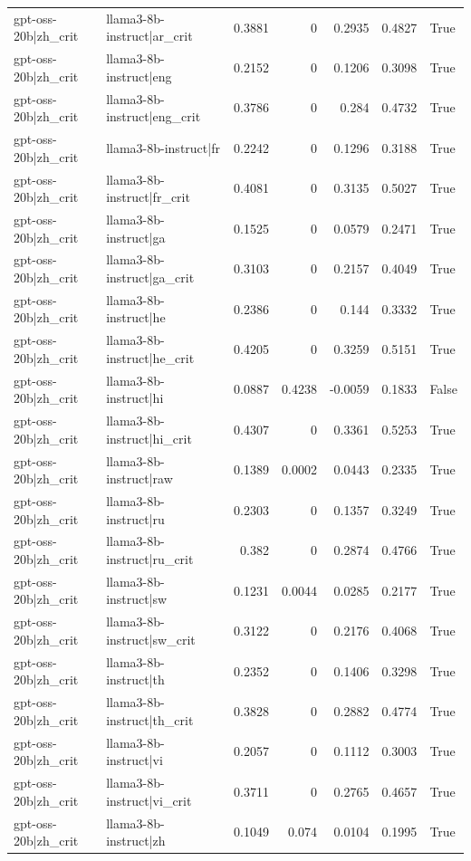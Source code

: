 \begin{table}
\begin{tabular}{l l r r r r l}
gpt-oss-20b|zh_crit & llama3-8b-instruct|ar_crit & 0.3881 & 0 & 0.2935 & 0.4827 & True \\
gpt-oss-20b|zh_crit & llama3-8b-instruct|eng & 0.2152 & 0 & 0.1206 & 0.3098 & True \\
gpt-oss-20b|zh_crit & llama3-8b-instruct|eng_crit & 0.3786 & 0 & 0.284 & 0.4732 & True \\
gpt-oss-20b|zh_crit & llama3-8b-instruct|fr & 0.2242 & 0 & 0.1296 & 0.3188 & True \\
gpt-oss-20b|zh_crit & llama3-8b-instruct|fr_crit & 0.4081 & 0 & 0.3135 & 0.5027 & True \\
gpt-oss-20b|zh_crit & llama3-8b-instruct|ga & 0.1525 & 0 & 0.0579 & 0.2471 & True \\
gpt-oss-20b|zh_crit & llama3-8b-instruct|ga_crit & 0.3103 & 0 & 0.2157 & 0.4049 & True \\
gpt-oss-20b|zh_crit & llama3-8b-instruct|he & 0.2386 & 0 & 0.144 & 0.3332 & True \\
gpt-oss-20b|zh_crit & llama3-8b-instruct|he_crit & 0.4205 & 0 & 0.3259 & 0.5151 & True \\
gpt-oss-20b|zh_crit & llama3-8b-instruct|hi & 0.0887 & 0.4238 & -0.0059 & 0.1833 & False \\
gpt-oss-20b|zh_crit & llama3-8b-instruct|hi_crit & 0.4307 & 0 & 0.3361 & 0.5253 & True \\
gpt-oss-20b|zh_crit & llama3-8b-instruct|raw & 0.1389 & 0.0002 & 0.0443 & 0.2335 & True \\
gpt-oss-20b|zh_crit & llama3-8b-instruct|ru & 0.2303 & 0 & 0.1357 & 0.3249 & True \\
gpt-oss-20b|zh_crit & llama3-8b-instruct|ru_crit & 0.382 & 0 & 0.2874 & 0.4766 & True \\
gpt-oss-20b|zh_crit & llama3-8b-instruct|sw & 0.1231 & 0.0044 & 0.0285 & 0.2177 & True \\
gpt-oss-20b|zh_crit & llama3-8b-instruct|sw_crit & 0.3122 & 0 & 0.2176 & 0.4068 & True \\
gpt-oss-20b|zh_crit & llama3-8b-instruct|th & 0.2352 & 0 & 0.1406 & 0.3298 & True \\
gpt-oss-20b|zh_crit & llama3-8b-instruct|th_crit & 0.3828 & 0 & 0.2882 & 0.4774 & True \\
gpt-oss-20b|zh_crit & llama3-8b-instruct|vi & 0.2057 & 0 & 0.1112 & 0.3003 & True \\
gpt-oss-20b|zh_crit & llama3-8b-instruct|vi_crit & 0.3711 & 0 & 0.2765 & 0.4657 & True \\
gpt-oss-20b|zh_crit & llama3-8b-instruct|zh & 0.1049 & 0.074 & 0.0104 & 0.1995 & True \\

\end{tabular}
\end{table}
